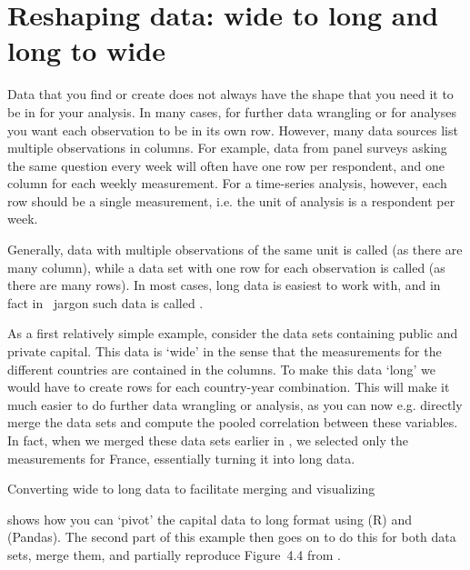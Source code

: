 \section{Reshaping data: wide to long and long to wide}\label{sec:pivot}

Data that you find or create does not always have the shape that you need it to be in for your analysis.
In many cases, for further data wrangling or for analyses you want each observation to be in its own row.
However, many data sources list multiple observations in columns.
For example, data from panel surveys asking the same question every week will often have one row per respondent,
and one column for each weekly measurement.
For a time-series analysis, however, each row should be a single measurement,
i.e. the unit of analysis is a respondent per week.

Generally, data with multiple observations of the same unit is called  (as there are many column),
while a data set with one row for each observation is called  (as there are many rows).
In most cases, long data is easiest to work with, and in fact in \tidyverse\ jargon such data is called .

As a first relatively simple example, consider the data sets containing public and private capital.
This data is `wide' in the sense that the measurements for the different countries are contained in the columns.
To make this data `long' we would have to create rows for each country-year combination.
This will make it much easier to do further data wrangling or analysis, as you can now e.g. directly merge the data sets and compute the pooled correlation between these variables. 
In fact, when we merged these data sets earlier in , we selected only the measurements for France, essentially turning it into long data.

\begin{ccsexample}
  \begin{tcolorbox}[title=Output]
    \texttt{[image: \{snippets/chapter07/merge2.r]}.png}
  \end{tcolorbox}
  \caption{Converting wide to long data to facilitate merging and visualizing}\label{ex:merge}
\end{ccsexample}

 shows how you can `pivot' the capital data to long format using  (R) and  (Pandas). The second part of this example then goes on to do this for both data sets, merge them, and partially reproduce Figure~4.4 from \citet{piketty}.

